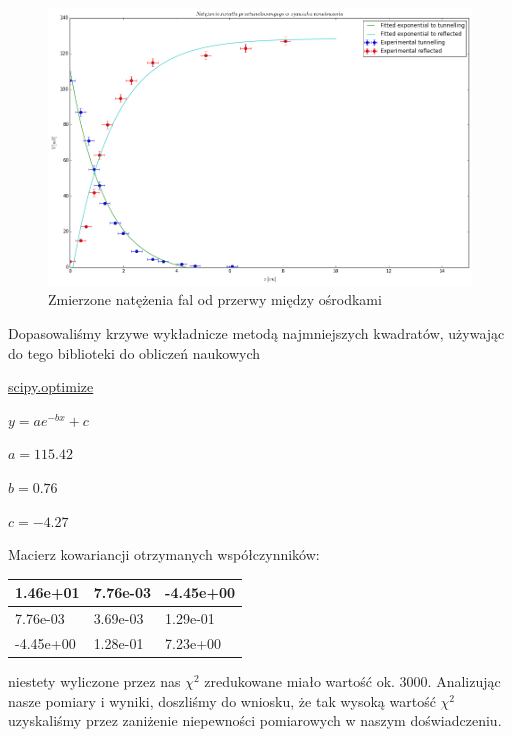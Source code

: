 \documentclass[a4paper,12pt]{article}
\begin{document}
\begin{figure} [H]
  \begin{center}
    \includegraphics[width = 15cm]{prettier_plot.png}
    \caption{Zmierzone natężenia fal od przerwy między ośrodkami}
  \end{center}
\end{figure}

Dopasowaliśmy krzywe wykładnicze metodą najmniejszych kwadratów, używając do tego biblioteki do obliczeń naukowych 

\href{'http://docs.scipy.org/doc/scipy/reference/tutorial/optimize.html'}{scipy.optimize}


$y = a e^{-bx} + c$

$a = 115.42$

$b = 0.76$

$c = -4.27 $


Macierz kowariancji otrzymanych współczynników:

\begin{center}

    \begin{tabular}{ | m{5cm}| m{5cm} | m{5cm} |} \hline
    
    
    1.46e+01  &   7.76e-03 & -4.45e+00 \\ \hline

 	7.76e-03  & 3.69e-03  & 1.29e-01 \\ \hline
    
    -4.45e+00 &  1.28e-01 &  7.23e+00 \\ \hline
    \end{tabular}
\end{center}


niestety wyliczone przez nas $\chi^2$ zredukowane miało wartość ok. 3000. Analizując nasze pomiary i wyniki, doszliśmy do wniosku, że tak wysoką wartość $\chi^2$ uzyskaliśmy przez zaniżenie niepewności pomiarowych w naszym doświadczeniu.
\end{document}
